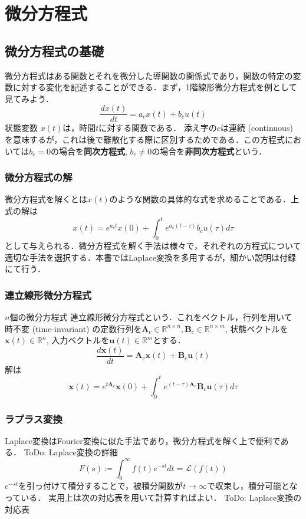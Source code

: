 \section{微分方程式}
\subsection{微分方程式の基礎}
微分方程式はある関数とそれを微分した導関数の関係式であり，関数の特定の変数に対する変化を記述することができる．まず，1階線形微分方程式を例として見てみよう．
\begin{equation}
\frac{dx(t)}{dt}=a_c x(t)+b_c u(t)
\end{equation}
状態変数 $x(t)$は，時間$t$に対する関数である．
添え字の$c$は連続 (continuous) を意味するが，これは後で離散化する際に区別するためである．この方程式においては$b_c=0$の場合を\textbf{同次方程式}, $b_c\neq 0$の場合を\textbf{非同次方程式}という．
\subsubsection{微分方程式の解}
微分方程式を解くとは$x(t)$のような関数の具体的な式を求めることである．上式の解は
\begin{equation}
x(t)=e^{a_c t}x(0)+\int_0^t e^{a_c (t-\tau)}b_c u(\tau) d\tau
\end{equation}
として与えられる．微分方程式を解く手法は様々で，それぞれの方程式について適切な手法を選択する．本書ではLaplace変換を多用するが，細かい説明は付録にて行う．
\subsubsection{連立線形微分方程式}
$n$個の微分方程式
連立線形微分方程式という．これをベクトル，行列を用いて
時不変 (time-invariant) の定数行列を$\mathbf{A}_c \in \mathbb{R}^{n\times n}, \mathbf{B}_c \in \mathbb{R}^{n\times m}$, 状態ベクトルを$\mathbf{x}(t)\in\mathbb{R}^n$, 入力ベクトルを$\mathbf{u}(t)\in\mathbb{R}^m$とする．
\begin{equation}
\frac{d\mathbf{x}(t)}{dt} = \mathbf{A}_c\mathbf{x}(t) + \mathbf{B}_c\mathbf{u}(t)
\end{equation}
解は
\begin{equation}
\mathbf{x}(t)=e^{t\mathbf{A}_c}\mathbf{x}(0)+\int_0^t e^{(t-\tau)\mathbf{A}_c}\mathbf{B}_c\mathbf{u}(\tau) d\tau
\end{equation}
\subsubsection{ラプラス変換}
Laplace変換はFourier変換に似た手法であり，微分方程式を解く上で便利である．
ToDo: Laplace変換の詳細
\begin{equation}
F(s)\coloneqq\int_0^{\infty} f(t) e^{-st} dt=\mathcal{L}(f(t))
\end{equation}
$e^{-st}$を引っ付けて積分することで，被積分関数が$t\to \infty$で収束し，積分可能となっている．
実用上は次の対応表を用いて計算すればよい．
ToDo: Laplace変換の対応表
